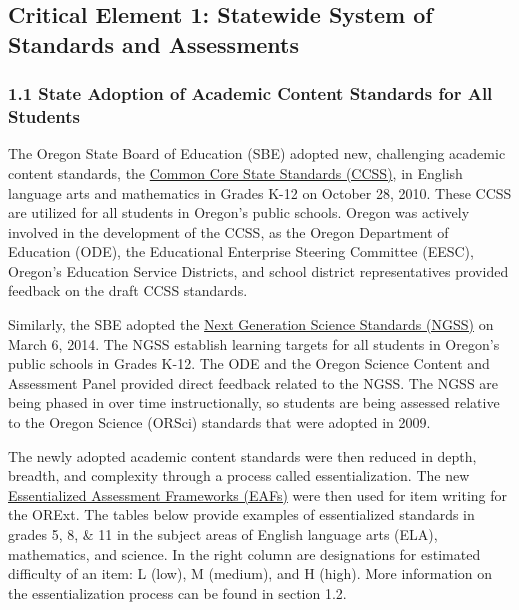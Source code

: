 \documentclass[]{article}
\title{}
\author{}
\date{}
\begin{document}
{
\setcounter{tocdepth}{5}
\tableofcontents
}
\hypertarget{critical-element-1-statewide-system-of-standards-and-assessments}{%
\subsection{Critical Element 1: Statewide System of Standards and
Assessments}\label{critical-element-1-statewide-system-of-standards-and-assessments}}

\hypertarget{state-adoption-of-academic-content-standards-for-all-students}{%
\subsubsection{1.1 State Adoption of Academic Content Standards for All
Students}\label{state-adoption-of-academic-content-standards-for-all-students}}

The Oregon State Board of Education (SBE) adopted new, challenging
academic content standards, the
\color{link}\href{https://www.oregon.gov/ode/educator-resources/standards/Pages/default.aspx}{Common
Core State Standards (CCSS)}\color{black}, in English language arts and
mathematics in Grades K-12 on October 28, 2010. These CCSS are utilized
for all students in Oregon's public schools. Oregon was actively
involved in the development of the CCSS, as the Oregon Department of
Education (ODE), the Educational Enterprise Steering Committee (EESC),
Oregon's Education Service Districts, and school district
representatives provided feedback on the draft CCSS standards.

Similarly, the SBE adopted the
\color{link}\href{https://www.oregon.gov/ode/educator-resources/standards/science/Pages/Science-Standards.aspx}{Next
Generation Science Standards (NGSS)} \color{black} on March 6, 2014. The
NGSS establish learning targets for all students in Oregon's public
schools in Grades K-12. The ODE and the Oregon Science Content and
Assessment Panel provided direct feedback related to the NGSS. The NGSS
are being phased in over time instructionally, so students are being
assessed relative to the Oregon Science (ORSci) standards that were
adopted in 2009.

The newly adopted academic content standards were then reduced in depth,
breadth, and complexity through a process called essentialization. The
new
\color{link}\href{http://www.brtprojects.org/publications/training-modules}{Essentialized
Assessment Frameworks (EAFs)} \color{black} were then used for item
writing for the ORExt. The tables below provide examples of
essentialized standards in grades 5, 8, \& 11 in the subject areas of
English language arts (ELA), mathematics, and science. In the right
column are designations for estimated difficulty of an item: L (low), M
(medium), and H (high). More information on the essentialization process
can be found in section 1.2.
\end{document}
